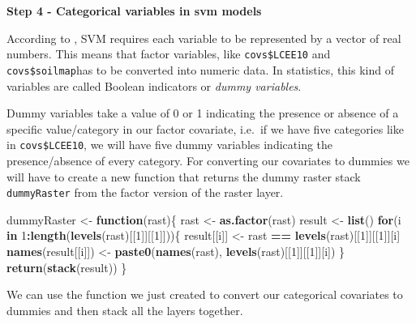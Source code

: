 \documentclass[10pt,b5paper,]{book}
\newenvironment{Shaded}{\begin{snugshade}}{\end{snugshade}}
\newcommand{\CommentTok}[1]{\textcolor[rgb]{0.56,0.35,0.01}{\textit{#1}}}
\newcommand{\ControlFlowTok}[1]{\textcolor[rgb]{0.13,0.29,0.53}{\textbf{#1}}}
\newcommand{\DecValTok}[1]{\textcolor[rgb]{0.00,0.00,0.81}{#1}}
\newcommand{\KeywordTok}[1]{\textcolor[rgb]{0.13,0.29,0.53}{\textbf{#1}}}
\newcommand{\NormalTok}[1]{#1}
\newcommand{\OperatorTok}[1]{\textcolor[rgb]{0.81,0.36,0.00}{\textbf{#1}}}
\newcommand{\StringTok}[1]{\textcolor[rgb]{0.31,0.60,0.02}{#1}}
\theoremstyle{definition}
\theoremstyle{definition}
\theoremstyle{definition}
\theoremstyle{remark}
\begin{document}
\textbf{Step 4 - Categorical variables in svm models}

According to \citet{hsu2003practical}, SVM requires each variable to be
represented by a vector of real numbers. This means that factor
variables, like \texttt{covs\$LCEE10} and \texttt{covs\$soilmap}has to
be converted into numeric data. In statistics, this kind of variables
are called Boolean indicators or \emph{dummy variables}.

Dummy variables take a value of 0 or 1 indicating the presence or
absence of a specific value/category in our factor covariate, i.e.~if we
have five categories like in \texttt{covs\$LCEE10}, we will have five
dummy variables indicating the presence/absence of every category. For
converting our covariates to dummies we will have to create a new
function that returns the dummy raster stack \texttt{dummyRaster} from
the factor version of the raster layer.

\begin{Shaded}
\begin{Highlighting}[]
\NormalTok{dummyRaster <-}\StringTok{ }\ControlFlowTok{function}\NormalTok{(rast)\{}
\NormalTok{  rast <-}\StringTok{ }\KeywordTok{as.factor}\NormalTok{(rast)}
\NormalTok{  result <-}\StringTok{ }\KeywordTok{list}\NormalTok{()}
  \ControlFlowTok{for}\NormalTok{(i }\ControlFlowTok{in} \DecValTok{1}\OperatorTok{:}\KeywordTok{length}\NormalTok{(}\KeywordTok{levels}\NormalTok{(rast)[[}\DecValTok{1}\NormalTok{]][[}\DecValTok{1}\NormalTok{]]))\{}
\NormalTok{    result[[i]] <-}\StringTok{ }\NormalTok{rast }\OperatorTok{==}\StringTok{ }\KeywordTok{levels}\NormalTok{(rast)[[}\DecValTok{1}\NormalTok{]][[}\DecValTok{1}\NormalTok{]][i]}
    \KeywordTok{names}\NormalTok{(result[[i]]) <-}\StringTok{ }\KeywordTok{paste0}\NormalTok{(}\KeywordTok{names}\NormalTok{(rast), }
                                 \KeywordTok{levels}\NormalTok{(rast)[[}\DecValTok{1}\NormalTok{]][[}\DecValTok{1}\NormalTok{]][i])}
\NormalTok{  \}}
  \KeywordTok{return}\NormalTok{(}\KeywordTok{stack}\NormalTok{(result))}
\NormalTok{\}}
\end{Highlighting}
\end{Shaded}

We can use the function we just created to convert our categorical
covariates to dummies and then stack all the layers together.

\begin{Shaded}
\end{Shaded}
\end{document}
